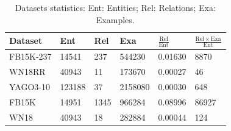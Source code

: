 \documentclass[11pt]{article}
\begin{document}
\begin{table}
\centering
\begin{tabular}{llllll}
    \hline
    Dataset & Ent & Rel & Exa & $\mathrm{\frac{Rel}{Ent}}$ & $\mathrm{\frac{Rel\times Exa}{Ent}}$\\
    \hline
    FB15K-237 & 14541 & 237 & 544230 & 0.01630 & 8870\\
    WN18RR & 40943 & 11 & 173670 & 0.00027 & 46\\
    YAGO3-10 & 123188 & 37 & 2158080 & 0.00030 & 648\\
    FB15K & 14951 & 1345 & 966284 & 0.08996 & 86927\\
    WN18 & 40943 & 18 & 282884 & 0.00044 &124\\
    \hline
\end{tabular}
\caption{Datasets statistics: Ent: Entities; Rel: Relations; Exa: Examples.}
\label{datasets}
\end{table}
\end{document}
